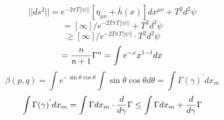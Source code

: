 \documentclass{jsarticle}
\begin{document}
\title{}
\author{}
\date{}
\maketitle

  $$ ||ds^2|| = e^{-2\pi T||\psi||}[\eta_{\mu\nu} + \bar{h}(x)]dx^{{\mu}{\nu}}
  + T^2d^2 \psi $$
  $$ = [\infty]/e^{-2T\pi T||\psi||} + T^2d^2\psi $$
  $$ \ge  [\infty]/e^{-2T\pi T||\psi||} \cdot T^2d^2\psi $$
  $$ = {n \over {n + 1}}\Gamma^n = \int e^{-x}x^{1 - t}dx $$
  $$ \beta(p,q) = \int e^{-\sin \theta \cos \theta}\int \sin \theta \cos \theta
  d\theta = \int \Gamma(\gamma)^{'}dx_m $$
  $$ \int \Gamma(\gamma)^{'}dx_m = \int \Gamma dx_m \cdot {d \over d\gamma}
  \Gamma \le \int \Gamma dx_m + {d \over d \gamma}\Gamma $$
\end{document}
